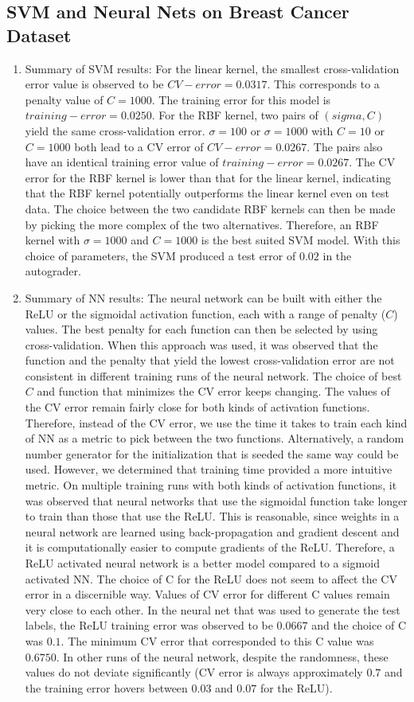 \documentclass[english]{article}
\begin{document}
\subsection{SVM and Neural Nets on Breast Cancer Dataset}
\begin{enumerate}
    \item Summary of SVM results:
    	For the linear kernel, the smallest cross-validation error value is observed to be $CV-error = 0.0317$. This corresponds to a penalty value of  $C = 1000$. The training error for this model is $training-error = 0.0250$. For the RBF kernel, two pairs of $(sigma, C)$ yield the same cross-validation error. $\sigma = 100$ or $\sigma = 1000$ with $C = 10$ or $C = 1000$ both lead to a CV error of $CV-error = 0.0267$. The pairs also have an identical training error value of $training-error = 0.0267$. The CV error for the RBF kernel is lower than that for the linear kernel, indicating that the RBF kernel potentially outperforms the linear kernel even on test data. The choice between the two candidate RBF kernels can then be made by picking the more complex of the two alternatives. Therefore, an RBF kernel with $\sigma = 1000$ and $C = 1000$ is the best suited SVM model. With this choice of parameters, the SVM produced a test error of $0.02$ in the autograder. 
    \item Summary of NN results: 
    	The neural network can be built with either the ReLU or the sigmoidal activation function, each with a range of penalty ($C$) values. The best penalty for each function can then be selected by using cross-validation. When this approach was used, it was observed that the function and the penalty that yield the lowest cross-validation error are not consistent in different training runs of the neural network. The choice of best $C$ and function that minimizes the CV error keeps changing. The values of the CV error remain fairly close for both kinds of activation functions. Therefore, instead of the CV error, we use the time it takes to train each kind of NN as a metric to pick between the two functions. Alternatively, a random number generator for the initialization that is seeded the same way could be used. However, we determined that training time provided a more intuitive metric. 
	On multiple training runs with both kinds of activation functions, it was observed that neural networks that use the sigmoidal function take longer to train than those that use the ReLU. This is reasonable, since weights in a neural network are learned using back-propagation and gradient descent and it is computationally easier to compute gradients of the ReLU. Therefore, a ReLU activated neural network is a better model compared to a sigmoid activated NN. The choice of C for the ReLU does not seem to affect the CV error in a discernible way. Values of CV error for different C values remain very close to each other. In the neural net that was used to generate the test labels, the ReLU training error was observed to be $0.0667$ and the choice of C was $0.1$. The minimum CV error that corresponded to this C value was $0.6750$. In other runs of the neural network, despite the randomness, these values do not deviate significantly (CV error is always approximately $0.7$ and the training error hovers between $0.03$ and $0.07$ for the ReLU).  

\end{enumerate}
\end{document}
